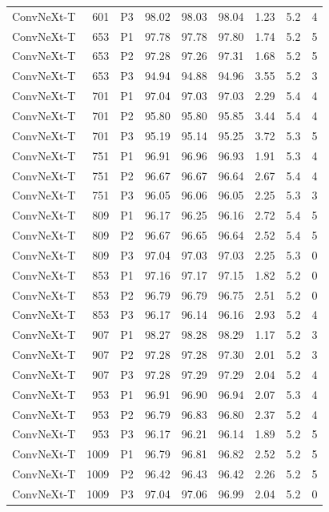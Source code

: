 {\begin{longtable}{lrlrrrrrr}
ConvNeXt-T & 601 & P3 & 98.02 & 98.03 & 98.04 & 1.23 & 5.2 & 4 \\
ConvNeXt-T & 653 & P1 & 97.78 & 97.78 & 97.80 & 1.74 & 5.2 & 5 \\
ConvNeXt-T & 653 & P2 & 97.28 & 97.26 & 97.31 & 1.68 & 5.2 & 5 \\
ConvNeXt-T & 653 & P3 & 94.94 & 94.88 & 94.96 & 3.55 & 5.2 & 3 \\
ConvNeXt-T & 701 & P1 & 97.04 & 97.03 & 97.03 & 2.29 & 5.4 & 4 \\
ConvNeXt-T & 701 & P2 & 95.80 & 95.80 & 95.85 & 3.44 & 5.4 & 4 \\
ConvNeXt-T & 701 & P3 & 95.19 & 95.14 & 95.25 & 3.72 & 5.3 & 5 \\
ConvNeXt-T & 751 & P1 & 96.91 & 96.96 & 96.93 & 1.91 & 5.3 & 4 \\
ConvNeXt-T & 751 & P2 & 96.67 & 96.67 & 96.64 & 2.67 & 5.4 & 4 \\
ConvNeXt-T & 751 & P3 & 96.05 & 96.06 & 96.05 & 2.25 & 5.3 & 3 \\
ConvNeXt-T & 809 & P1 & 96.17 & 96.25 & 96.16 & 2.72 & 5.4 & 5 \\
ConvNeXt-T & 809 & P2 & 96.67 & 96.65 & 96.64 & 2.52 & 5.4 & 5 \\
ConvNeXt-T & 809 & P3 & 97.04 & 97.03 & 97.03 & 2.25 & 5.3 & 0 \\
ConvNeXt-T & 853 & P1 & 97.16 & 97.17 & 97.15 & 1.82 & 5.2 & 0 \\
ConvNeXt-T & 853 & P2 & 96.79 & 96.79 & 96.75 & 2.51 & 5.2 & 0 \\
ConvNeXt-T & 853 & P3 & 96.17 & 96.14 & 96.16 & 2.93 & 5.2 & 4 \\
ConvNeXt-T & 907 & P1 & 98.27 & 98.28 & 98.29 & 1.17 & 5.2 & 3 \\
ConvNeXt-T & 907 & P2 & 97.28 & 97.28 & 97.30 & 2.01 & 5.2 & 3 \\
ConvNeXt-T & 907 & P3 & 97.28 & 97.29 & 97.29 & 2.04 & 5.2 & 4 \\
ConvNeXt-T & 953 & P1 & 96.91 & 96.90 & 96.94 & 2.07 & 5.3 & 4 \\
ConvNeXt-T & 953 & P2 & 96.79 & 96.83 & 96.80 & 2.37 & 5.2 & 4 \\
ConvNeXt-T & 953 & P3 & 96.17 & 96.21 & 96.14 & 1.89 & 5.2 & 5 \\
ConvNeXt-T & 1009 & P1 & 96.79 & 96.81 & 96.82 & 2.52 & 5.2 & 5 \\
ConvNeXt-T & 1009 & P2 & 96.42 & 96.43 & 96.42 & 2.26 & 5.2 & 5 \\
ConvNeXt-T & 1009 & P3 & 97.04 & 97.06 & 96.99 & 2.04 & 5.2 & 0 \\

\end{longtable}}
